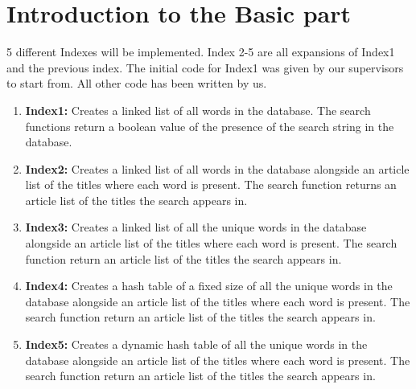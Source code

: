 \section{Introduction to the Basic part}


5 different Indexes will be implemented. Index 2-5 are all expansions of Index1 and the previous index. The initial code for Index1 was given by our supervisors to start from. All other code has been written by us. 

\begin{enumerate}
    \item[] \textbf{Index1:} Creates a linked list of all words in the database. The search functions return a boolean value of the presence of the search string in the database.
    \item[] \textbf{Index2:} Creates a linked list of all words in the database alongside an article list of the titles where each word is present. The search function returns an article list of the titles the search appears in. 
    \item[] \textbf{Index3:} Creates a linked list of all the unique words in the database alongside an article list of the titles where each word is present. The search function return an article list of the titles the search appears in.
    \item[] \textbf{Index4:} Creates a hash table of a fixed size of all the unique words in the database alongside an article list of the titles where each word is present. The search function return an article list of the titles the search appears in.
    \item[] \textbf{Index5:} Creates a dynamic hash table of all the unique words in the database alongside an article list of the titles where each word is present. The search function return an article list of the titles the search appears in.
\end{enumerate}




